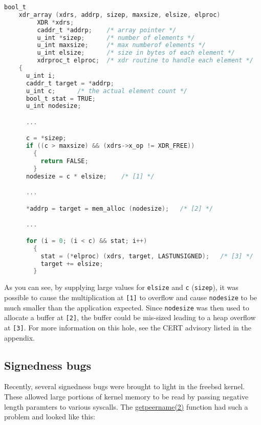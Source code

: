 \documentclass{iacrtrans}
\begin{document}
\begin{lstlisting}[language=c]
    bool_t
    xdr_array (xdrs, addrp, sizep, maxsize, elsize, elproc)
         XDR *xdrs;
         caddr_t *addrp;    /* array pointer */
         u_int *sizep;      /* number of elements */
         u_int maxsize;     /* max numberof elements */
         u_int elsize;      /* size in bytes of each element */
         xdrproc_t elproc;  /* xdr routine to handle each element */
    {
      u_int i;
      caddr_t target = *addrp;
      u_int c;		/* the actual element count */
      bool_t stat = TRUE;
      u_int nodesize;

      ...

      c = *sizep;
      if ((c > maxsize) && (xdrs->x_op != XDR_FREE))
        {
          return FALSE;
        }
      nodesize = c * elsize;    /* [1] */

      ...

      *addrp = target = mem_alloc (nodesize);   /* [2] */

      ...

      for (i = 0; (i < c) && stat; i++)
        {
          stat = (*elproc) (xdrs, target, LASTUNSIGNED);   /* [3] */
          target += elsize;
        }
\end{lstlisting}

As you can see, by supplying large values for \texttt{elsize} and \texttt{c} (\texttt{sizep}), it
was possible to cause the multiplication at \texttt{[1]} to overflow and cause
\texttt{nodesize} to be much smaller than the application expected.  Since
\texttt{nodesize} was then used to allocate a buffer at \texttt{[2]}, the buffer could be
mis-sized leading to a heap overflow at \texttt{[3]}.  For more information on this
hole, see the CERT advisory listed in the appendix.


\subsection{Signedness bugs}

Recently, several signedness bugs were brought to light in the freebsd
kernel.  These allowed large portions of kernel memory to be read by
passing
negative length paramters to various syscalls.  The \href{https://man7.org/linux/man-pages/man2/getpeername.2.html}{getpeername(2)} function
had such a problem and looked like this:
\end{document}
